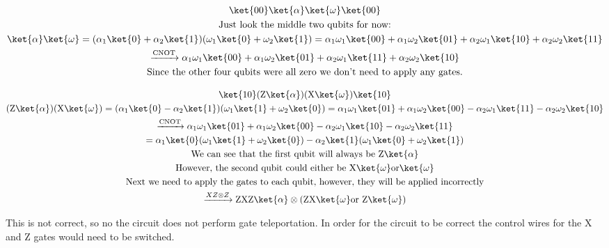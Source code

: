 \documentclass[]{article}
\begin{document}
\begin{enumerate}
        \begin{gather*}
          \ket{00}\ket{\alpha}\ket{\omega}\ket{00}\\
          \text{Just look the middle two qubits for now:}\\
          \ket{\alpha}\ket{\omega} = (\alpha_1 \ket{0} + \alpha_2 \ket{1})(\omega_1 \ket{0} + \omega_2 \ket{1})
          = \alpha_1 \omega_1 \ket{00} + \alpha_1 \omega_2 \ket{01} + \alpha_2 \omega_1 \ket{10} 
          + \alpha_2 \omega_2 \ket{11} \\
          \xrightarrow{\text{CNOT}} \alpha_1 \omega_1 \ket{00} + \alpha_1 \omega_2 \ket{01}
          + \alpha_2 \omega_1 \ket{11} + \alpha_2 \omega_2 \ket{10} \\
          \text{Since the other four qubits were all zero we don't need to apply any gates.}\\
        \end{gather*}

        \begin{gather*}
          \ket{10}(\text{Z}\ket{\alpha})(\text{X}\ket{\omega})\ket{10}\\
          (\text{Z}\ket{\alpha})(\text{X}\ket{\omega}) = (\alpha_1 \ket{0} - \alpha_2 \ket{1})
          (\omega_1 \ket{1} + \omega_2 \ket{0}) = \alpha_1 \omega_1 \ket{01} + \alpha_1 \omega_2 \ket{00}
          - \alpha_2 \omega_1 \ket{11} - \alpha_2 \omega_2 \ket{10}\\
          \xrightarrow{\text{CNOT}} \alpha_1 \omega_1 \ket{01} + \alpha_1 \omega_2 \ket{00}
          - \alpha_2 \omega_1 \ket{10} - \alpha_2 \omega_2 \ket{11}\\
          = \alpha_1 \ket{0} (\omega_1 \ket{1} + \omega_2 \ket{0}) 
          - \alpha_2 \ket{1} (\omega_1\ket{0} + \omega_2 \ket{1})\\
          \text{We can see that the first qubit will always be Z}\ket{\alpha} \\
          \text{However, the second qubit could either be X}\ket{\omega} \text{or}\ket{\omega}\\
          \text{Next we need to apply the gates to each qubit, however, they will be applied incorrectly}\\
          \xrightarrow{XZ \otimes Z} \text{ZXZ} \ket{\alpha} \otimes (\text{ZX} \ket{\omega} 
          \text{or } \text{Z} \ket{\omega})\\
        \end{gather*} 
        
        This is not correct, so no the circuit does not perform gate teleportation. In order for the circuit to be correct the control wires for the X and Z gates would need to be switched.


    \end{enumerate}
\end{document}
